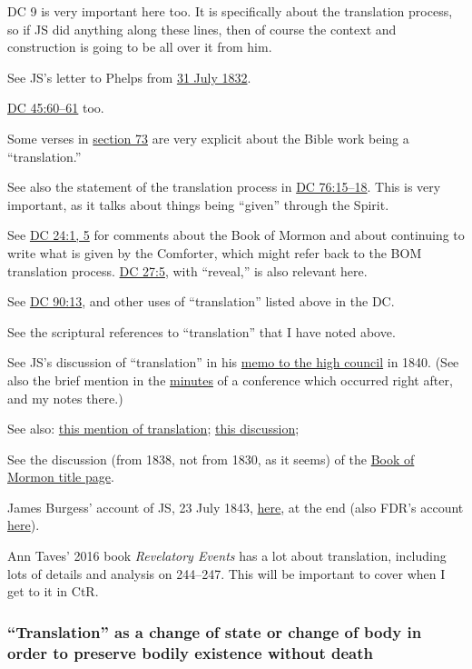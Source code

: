 		DC 9 is very important here too. It is specifically about the translation process, so if JS did anything along these lines, then of course the context and construction is going to be all over it from him.
		
		See JS's letter to Phelps from \hyperref[EMS-1832-JS-31-JUL-1832]{31 July 1832}.
		
		\hyperref[DC45-60]{DC 45:60--61} too. 
		
		Some verses in \hyperref[DC73]{section 73} are very explicit about the Bible work being a ``translation.''
		
		See also the statement of the translation process in \hyperref[DC76-15]{DC 76:15--18}. This is very important, as it talks about things being ``given'' through the Spirit.
		
		See \hyperref[DC24-1]{DC 24:1, 5} for comments about the Book of Mormon and about continuing to write what is given by the Comforter, which might refer back to the BOM translation process. \hyperref[DC27-5]{DC 27:5}, with ``reveal,'' is also relevant here.
		
		See \hyperref[DC90-13]{DC 90:13}, and other uses of ``translation'' listed above in the DC.
		
		See the scriptural references to ``translation'' that I have noted above.
		
		See JS's discussion of ``translation'' in his \hyperref[EMS-1840-JS-18-JUN-1840]{memo to the high council} in 1840. (See also the brief mention in the \hyperref[EMS-1840-JS-20-JUN-1840]{minutes} of a conference which occurred right after, and my notes there.)
		
		See also: \hyperref[EMS-1841-JS-16-AUG-1841-D-TS]{this mention of translation}; \hyperref[EMS-1842-JS-CIR-1-MAR-1842-DR]{this discussion}; 
		
		See the discussion (from 1838, not from 1830, as it seems) of the \hyperref[EMS-1830-JS-CIR-SPR-1830]{Book of Mormon title page}.
		
		James Burgess' account of JS, 23 July 1843, \hyperref[EMS-1843-JS-23-JUL-1843-JB]{here}, at the end (also FDR's account \hyperref[EMS-1843-JS-23-JUL-1843-FR]{here}).
		
		Ann Taves' 2016 book \textit{Revelatory Events} has a lot about translation, including lots of details and analysis on 244--247. This will be important to cover when I get to it in CtR.
		
	\subsubsection{``Translation'' as a change of state or change of body in order to preserve bodily existence without death}
		\label{TRANSLATION-change}
		
